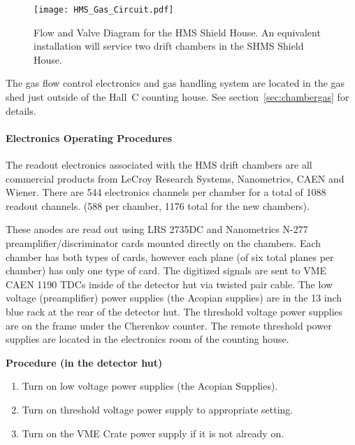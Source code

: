 {\begin{figure}
\begin{center}
\texttt{[image: HMS\_Gas\_Circuit.pdf]}
\caption{Flow and Valve Diagram for the HMS Shield House. An equivalent
installation will service two drift chambers in the SHMS Shield House.}
\label{fig:HMS_flow}
\end{center}
\end{figure}

The gas flow control electronics
and gas handling system are located in the gas shed just outside
of the Hall~C counting house.  See section~\ref{sec:chambergas} for details.

\paragraph{Electronics Operating Procedures}

The readout electronics associated with the HMS drift chambers are all
commercial products from LeCroy Research Systems, Nanometrics, CAEN
and Wiener.  There are 544 electronics channels per chamber for
a total of 1088 readout channels.  (588 per chamber, 1176 total
for the new chambers).

These anodes are read out using LRS 2735DC
and Nanometrics N-277 preamplifier/discriminator cards mounted directly
on the chambers.  Each chamber has both types of cards, however each plane
(of six total planes per chamber) has only one type of card.  The
digitized signals are sent to VME CAEN 1190 TDCs inside of the detector hut
via twisted pair cable.  The low voltage (preamplifier) power supplies
(the Acopian supplies)
are in the 13 inch blue rack at the rear of the detector hut.  The
threshold voltage power supplies are on the frame under the Cherenkov
counter.  The remote
threshold power supplies are located in the electronics room of the counting
house.

\begin{center}
{\bf Procedure (in the detector hut)}
\end{center}

\begin{enumerate}
\item {Turn on low voltage power supplies (the Acopian Supplies).}
\item {Turn on threshold voltage power supply to appropriate setting.}
\item {Turn on the VME Crate power supply if it is not already on.}
\end{enumerate}

}
